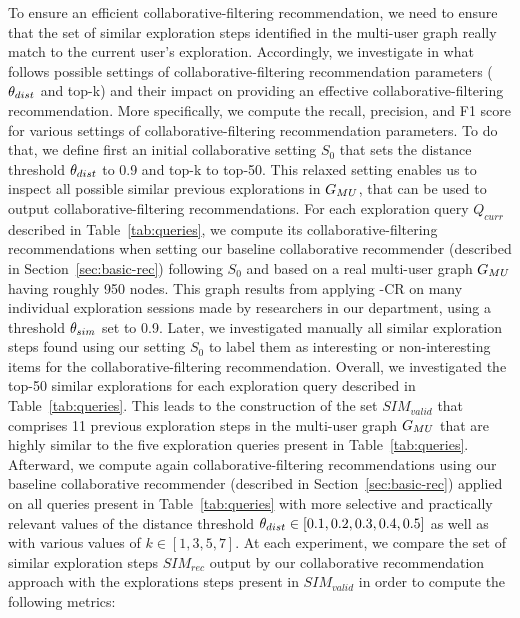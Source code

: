 To ensure an efficient collaborative-filtering recommendation, we need to ensure that the set of similar exploration steps identified in the multi-user graph really match to the current user's exploration.
Accordingly, we investigate in what follows possible settings of collaborative-filtering recommendation parameters ($\theta_{dist}$ and top-k) and their impact on providing an effective collaborative-filtering recommendation.
More specifically, we compute the recall, precision, and F1 score for various settings of collaborative-filtering recommendation parameters.
To do that, we define first an initial collaborative setting $S_0$ that sets the distance threshold $\theta_{dist}$ to 0.9 and top-k to top-50. 
This relaxed setting enables us to inspect all possible similar previous explorations in $G_{MU}$, that can be used to output collaborative-filtering recommendations.
For each exploration query $Q_{curr}$ described in Table~\ref{tab:queries}, we compute its collaborative-filtering recommendations when setting our baseline collaborative recommender (described in Section~\ref{sec:basic-rec}) following $S_0$ and based on a real multi-user graph $G_{MU}$ having roughly 950 nodes.
This graph results from applying \mlm-CR{} on many individual exploration sessions made by researchers in our department, using a threshold $\theta_{sim}$ set to 0.9.
Later, we investigated manually all similar exploration steps found using our setting $S_0$ to label them as interesting or non-interesting items for the collaborative-filtering recommendation.
 Overall, we investigated the top-50 similar explorations for each exploration query described in Table~\ref{tab:queries}. This leads to the construction of the set $SIM_{valid}$ that comprises 11 previous exploration steps in the multi-user graph $G_{MU}$ that are highly similar to the five exploration queries present in Table~\ref{tab:queries}.
Afterward, we compute again collaborative-filtering recommendations using our baseline collaborative recommender (described in Section~\ref{sec:basic-rec}) applied on all queries present in Table~\ref{tab:queries} with more selective and practically relevant values of the distance threshold $\theta_{dist} \in [0.1,0.2,0.3,0.4,0.5]$ as well as with various values of $k \in [1,3,5,7]$. At each experiment, we compare the set of similar exploration steps $SIM_{rec}$ output by our collaborative recommendation approach with the explorations steps present in $SIM_{valid}$ in order to compute the following metrics:
